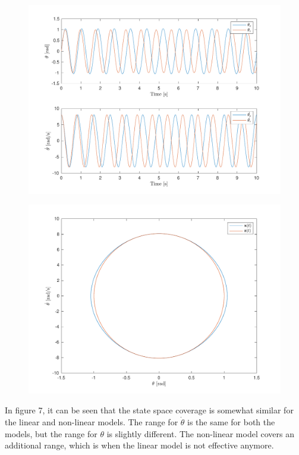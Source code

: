 \documentclass[10pt]{article}
\begin{document}
\begin{figure}[ht]
    \centering
    \begin{minipage}[b]{0.45\textwidth}
        \centering
        \includegraphics[width=1\linewidth]{lab1/figs/section5_X0_1_state_evolution.pdf}
    \end{minipage}
    \begin{minipage}[b]{0.45\textwidth}
        \centering
        \includegraphics[width=1\linewidth]{lab1/figs/section5_X0_1_state_orbit.pdf}
        \label{fig:test2}
    \end{minipage}
    
    \label{figure:x_0_1_state_evolution}
\end{figure}
    In figure 7, it can be seen that the state space coverage is somewhat similar for the linear and non-linear models. The range for $\dot{\theta}$ is the same for both the models, but the range for $\theta$ is slightly different. The non-linear model covers an additional range, which is when the linear model is not effective anymore.
    
\end{document}
